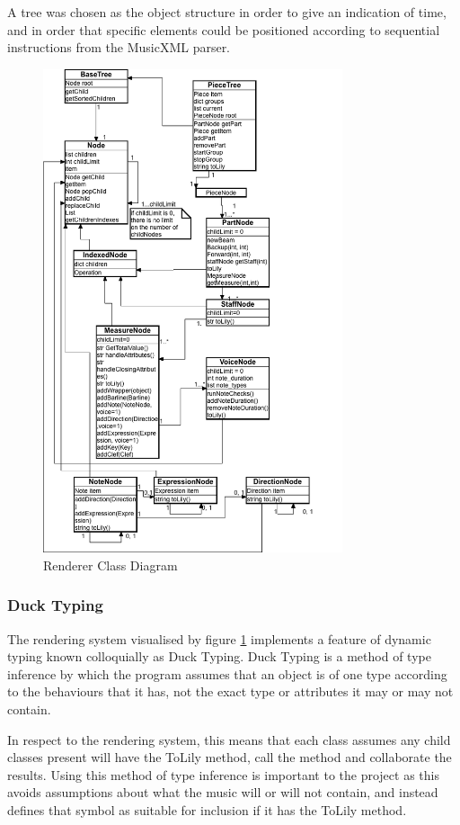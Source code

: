 A tree was chosen as the object structure in order to give an indication of time, and in order that specific elements could be positioned according to sequential instructions from the MusicXML parser. 
\begin{figure}[H]
    \centering
    \includegraphics[width=250pt]{diagrams/render-tree.png}
    \caption{Renderer Class Diagram}
    \label{fig:classdiagram}
\end{figure}
\subsubsection{Duck Typing}
The rendering system visualised by figure \ref{fig:classdiagram} implements a feature of dynamic typing known colloquially as Duck Typing. Duck Typing is a method of type inference by which the program assumes that an object is of one type according to the behaviours that it has, not the exact type or attributes it may or may not contain. %

In respect to the rendering system, this means that each class assumes any child classes present will have the ToLily method, call the method and collaborate the results. Using this method of type inference is important to the project as this avoids assumptions about what the music will or will not contain, and instead defines that symbol as suitable for inclusion if it has the ToLily method. 

